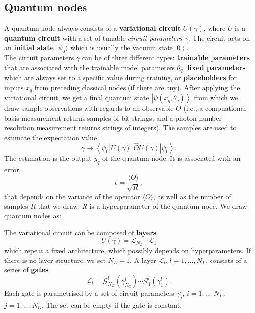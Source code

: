 \documentclass[aps,pra,10pt,twocolumn,groupedaddress,nofootinbib]{revtex4-1}
\theoremstyle{plain}
\newcommand{\ket}[1]{\ensuremath{\left| #1 \right \rangle}}
\newcommand{\bra}[1]{\ensuremath{\left \langle #1 \right |}}
\renewcommand{\L}{\mathcal{L}}
\newcommand{\G}{\mathcal{G}}
\begin{document}
\subsection{Quantum nodes}
A quantum node always consists of a \textbf{variational circuit} $U(\gamma)$, where $U$ is a \textbf{quantum circuit} with a set of tunable \textit{circuit parameters} $\gamma$. The circuit acts on an \textbf{initial state} $|\psi_0 \rangle$ which is usually the vacuum state $\ket{0}$.\\

The circuit parameters $\gamma$ can be of three different types: \textbf{trainable parameters} that are associated with the trainable model parameters  $\theta_q$, \textbf{fixed parameters} which are always set to a specific value during training, or \textbf{placeholders} for inputs $x_q$ from preceding classical nodes (if there are any). After applying the variational circuit, we get a final quantum state $\ket{\psi (x_q, \theta_q) }$ from which we draw sample observations with regards to an observable $O$ (i.e., a compuational basis measurement returns samples of bit strings, and a photon number resolution measurement returns strings of integers). The samples are used to estimate the expectation value 
\[\gamma \mapsto \bra{\psi_0} U(\gamma)^{\dagger}  \hat{O} U(\gamma) \ket{\psi_0}.\] 
The estimation is the output $y_q$ of the quantum node. It is associated with an error 
\[ \epsilon = \frac{\langle O \rangle}{\sqrt{R}}, \] 
that depends on the variance of the operator $\langle O \rangle$, as well as the number of samples $R$ that we draw. $R$ is a hyperparameter of the quantum node. We draw quantum nodes as:\\
\begin{figure}[h]
\centering
{}
\end{figure}


The variational circuit can be composed of \textbf{layers}
\[ U (\gamma) = \L_{N_L} \cdots \L_{1}\]
which repeat a fixed architecture, which possibly depends on hyperparameters. If there is no layer structure, we set $N_L=1$. A layer $\L_l$, $l=1,...,N_L$, consists of a series of \textbf{gates}
\[\L_l = \G^l_{N_G}(\gamma^l_{N_G}) \cdots \G^l_1(\gamma^l_1). \]
Each gate is parametrised by a set of circuit parameters
$\gamma^i_j$, $i = 1,...,N_L$, $j=1,...,N_G$. The set can be empty if the gate is constant.\\
\end{document}
